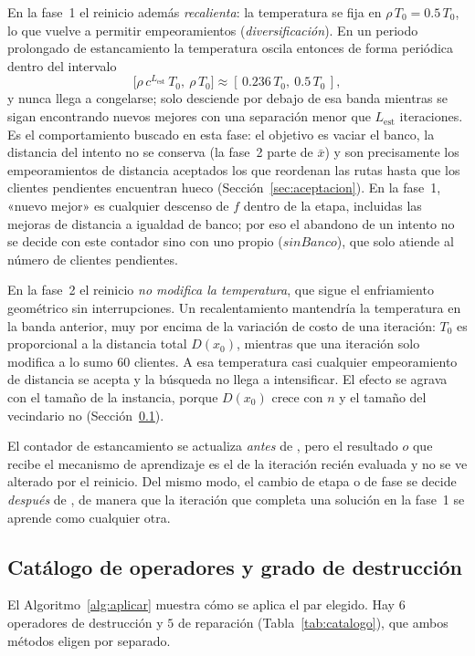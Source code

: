 En la fase~1 el reinicio además \emph{recalienta}: la temperatura se fija en
$\rho\,T_0=0.5\,T_0$, lo que vuelve a permitir empeoramientos (\emph{diversificación}). En un
periodo prolongado de estancamiento la temperatura oscila entonces de forma periódica dentro
del intervalo
\[
\bigl[\rho\,c^{L_{\mathrm{est}}}\,T_0,\ \rho\,T_0\bigr]\approx[\,0.236\,T_0,\ 0.5\,T_0\,],
\]
y nunca llega a congelarse; solo desciende por debajo de esa banda mientras se sigan
encontrando nuevos mejores con una separación menor que $L_{\mathrm{est}}$ iteraciones. Es el
comportamiento buscado en esta fase: el objetivo es vaciar el banco, la distancia del intento
no se conserva (la fase~2 parte de $\bar{x}$) y son precisamente los empeoramientos de
distancia aceptados los que reordenan las rutas hasta que los clientes pendientes encuentran
hueco (Sección~\ref{sec:aceptacion}). En la fase~1, «nuevo mejor» es cualquier descenso de $f$
dentro de la etapa, incluidas las mejoras de distancia a igualdad de banco; por eso el
abandono de un intento no se decide con este contador sino con uno propio
($\textit{sinBanco}$), que solo atiende al número de clientes pendientes.

En la fase~2 el reinicio \emph{no modifica la temperatura}, que sigue el enfriamiento
geométrico sin interrupciones. Un recalentamiento mantendría la temperatura en la banda
anterior, muy por encima de la variación de costo de una iteración: $T_0$ es proporcional a la
distancia total $D(x_0)$, mientras que una iteración solo modifica a lo sumo $60$ clientes. A
esa temperatura casi cualquier empeoramiento de distancia se acepta y la búsqueda no llega a
intensificar. El efecto se agrava con el tamaño de la instancia, porque $D(x_0)$ crece con $n$
y el tamaño del vecindario no (Sección~\ref{sec:catalogo}).

El contador de estancamiento se actualiza \emph{antes} de , pero el resultado $o$
que recibe el mecanismo de aprendizaje es el de la iteración recién evaluada y no se ve
alterado por el reinicio. Del mismo modo, el cambio de etapa o de fase se decide
\emph{después} de , de manera que la iteración que completa una solución en la
fase~1 se aprende como cualquier otra.

\subsection{Catálogo de operadores y grado de destrucción}
\label{sec:catalogo}

El Algoritmo~\ref{alg:aplicar} muestra cómo se aplica el par elegido. Hay $6$ operadores de
destrucción y $5$ de reparación (Tabla~\ref{tab:catalogo}), que ambos métodos eligen por separado.

